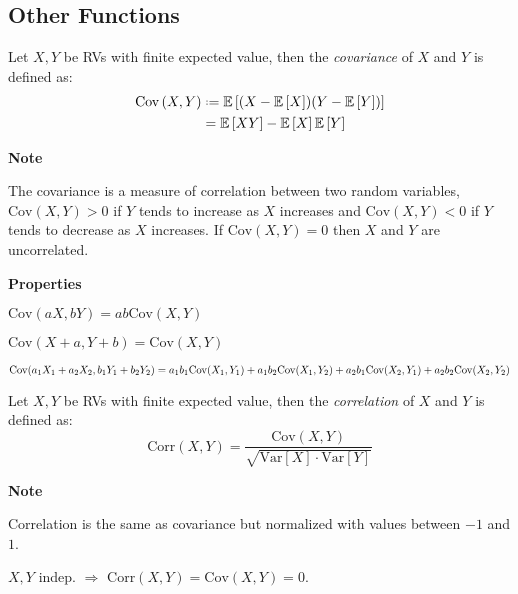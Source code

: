 \documentclass[8pt,a4paper]{extarticle}     %
\newcommand{\eqdef}{\mathrel{\vcenter{\baselineskip0.5ex\lineskiplimit0pt\hbox{\scriptsize.}\hbox{\scriptsize.}}}=}
\newcommand{\Var}{\mathrm{Var}}
\newcommand{\Cov}{\mathrm{Cov}}
\newcommand{\Corr}{\mathrm{Corr}}
\begin{document}
\begin{multicols}{4}
\subsection{Other Functions}

\begin{boxdefinition}[Covariance]
	Let $X,Y$ be RVs with finite expected value, then the \textit{covariance} of $X$ and $Y$ is defined as: 
	\[
		\begin{split}
			\Cov\left(X,Y\right) &\eqdef \mathbb{E}\left[(X-\mathbb{E}\left[X\right])(Y-\mathbb{E}\left[Y\right])\right] \\ 
			&= \mathbb{E}\left[XY\right]-\mathbb{E}\left[X\right]\mathbb{E}\left[Y\right]
		\end{split}
	\]
\end{boxdefinition}
\begin{listb}
	\item [] \textbf{Note}
	\item The covariance is a measure of correlation between two random variables, $\Cov\left(X,Y\right)>0$ if $Y$ tends to increase as $X$ increases and $\Cov\left(X,Y\right)<0$ if $Y$ tends to decrease as $X$ increases. If $\Cov\left(X,Y\right)=0$ then $X$ and $Y$ are uncorrelated. 
	\item [] \textbf{Properties}
	\item $\Cov(aX,bY)=ab\Cov(X,Y)$
	\item $\Cov(X+a,Y+b)=\Cov(X,Y)$ 
	\item $\Cov(a_1X_1+a_2X_2, b_1Y_1+b_2Y_2) = \\ a_1b_1\Cov(X_1,Y_1)+a_1b_2\Cov(X_1,Y_2)+ \\ a_2b_1\Cov(X_2,Y_1)+a_2b_2\Cov(X_2,Y_2)$
\end{listb}

\begin{boxdefinition}[Correlation] 
	Let $X,Y$ be RVs with finite expected value, then the \textit{correlation} of $X$ and $Y$ is defined as: 
	\[
		\Corr(X,Y) = \frac{\Cov\left(X,Y\right)}{\sqrt{\Var\left[X\right]\cdot\Var\left[Y\right]}}
	\]
\end{boxdefinition}
\begin{listb}
	\item [] \textbf{Note}
	\item Correlation is the same as covariance but normalized with values between $-1$ and $1$.
	\item $X,Y$ indep. $\Rightarrow$ $\Corr(X,Y)=\Cov(X,Y)=0$. 
\end{listb}



\end{multicols}
\end{document}

